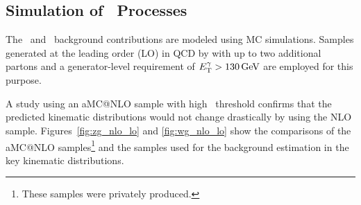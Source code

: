 \subsection{Simulation of \vg\ Processes}
\label{sec:vgmc}

The \zinvg\ and \wlng\ background contributions are modeled using MC simulations.
Samples generated at the leading order (LO) in QCD by  with up to two additional partons and a generator-level requirement of $E_{\mathrm{T}}^{\gamma} > 130\,\text{Ge\hspace{-.08em}V}$ are employed for this purpose.

A study using an aMC@NLO sample with high \ETg\ threshold confirms that the predicted kinematic distributions would not change drastically by using the NLO sample. 
Figures~\ref{fig:zg_nlo_lo} and \ref{fig:wg_nlo_lo} show the comparisons of the aMC@NLO samples\footnote{These samples were privately produced.} and the  samples used for the background estimation in the key kinematic distributions.

